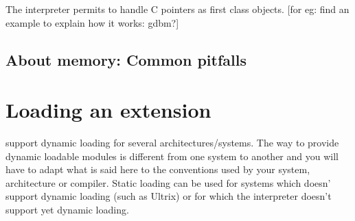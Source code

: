 \documentclass[10pt]{article}
\begin{document}
The {\stk} interpreter permits to handle C pointers as first class
objects. 
[for eg: find an example to explain how it works: gdbm?]

\subsection{About memory: Common pitfalls}


\section{Loading an extension}

{\stk} support dynamic loading for several architectures/systems. The
way to provide dynamic loadable modules is different from one system
to another and you will have to adapt what is said here to the
conventions used by your system, architecture or compiler. 
Static loading can be used for systems which doesn' support dynamic
loading (such as Ultrix) or for which the interpreter doesn't support
yet dynamic loading.
\end{document}
